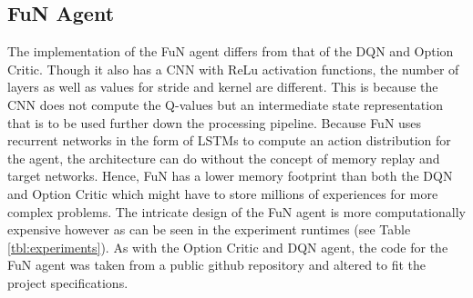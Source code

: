 \documentclass[notitlepage,a4paper,11pt]{article}
\begin{document}

\subsection{FuN Agent}\label{fun_experiment}
The implementation of the FuN agent differs from that of the DQN and Option Critic. Though it also has a CNN with ReLu activation functions, the number of layers as well as values for stride and kernel are different. This is because the CNN does not compute the Q-values but an intermediate state representation that is to be used further down the processing pipeline. Because FuN uses recurrent networks in the form of LSTMs to compute an action distribution for the agent, the architecture can do without the concept of memory replay and target networks. Hence, FuN has a lower memory footprint than both the DQN and Option Critic which might have to store millions of experiences for more complex problems. The intricate design of the FuN agent is more computationally expensive however as can be seen in the experiment runtimes (see Table \ref{tbl:experiments}). As with the Option Critic and DQN agent, the code for the FuN agent was taken from a public github repository \cite{fun_github} and altered to fit the project specifications.
\end{document}
